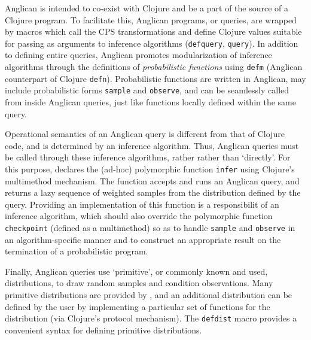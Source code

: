 \documentclass[preprint]{sigplanconf}
\begin{document}
Anglican is intended to co-exist with Clojure and be a part of
the source of a Clojure program. To facilitate this, Anglican
programs, or queries, are wrapped by macros\iftoggle{full}{ (defined in the
\texttt{anglican.emit} namespace)}{} which call the CPS
transformations and define Clojure values suitable for passing
as arguments to inference algorithms (\texttt{defquery},
\texttt{query}). In addition to defining entire queries,
Anglican promotes modularization of inference algorithms through
the definitions of \textit{probabilistic functions} using
\texttt{defm} (Anglican counterpart of Clojure \texttt{defn}).
Probabilistic functions are
written in Anglican, may include probabilistic forms
\texttt{sample} and \texttt{observe}, and can be seamlessly
called from inside Anglican queries, just like functions locally
defined within the same query.

Operational semantics of an Anglican query is different from that
of Clojure code, and is determined by an inference algorithm. Thus,
Anglican queries must be called through these inference algorithms, rather
rather than `directly'. For this purpose,
\iftoggle{full}{the
\texttt{anglican.inference} namespace}{Anglican} declares the (ad-hoc) polymorphic
function \texttt{infer} using Clojure's multimethod mechanism.
The function accepts and runs an Anglican query, 
and returns a lazy sequence of weighted samples from the
distribution defined by the query. Providing an implementation of this function
is a responsibilit of an inference algorithm, which should also
override the polymorphic function \texttt{checkpoint} (defined
as a multimethod) so as to handle \texttt{sample} and
\texttt{observe} in an algorithm-specific manner and
to construct an appropriate result on the
termination of a probabilistic program.


Finally, Anglican queries use `primitive', or commonly known and
used, distributions, to draw random samples and condition
observations. Many primitive distributions are provided by
\iftoggle{full}{the \texttt{anglican.runtime} namespace}{the
runtime}, and an additional distribution can be defined by the
user by implementing a particular set of functions for the
distribution (via Clojure's protocol mechanism). The
\texttt{defdist} macro provides a convenient syntax for defining
primitive distributions.
\end{document}
